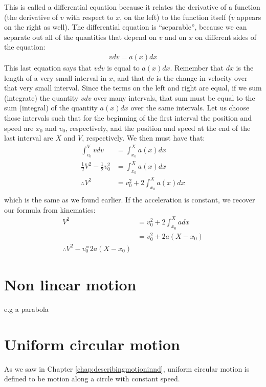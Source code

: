 This is called a differential equation because it relates the derivative of a function (the derivative of $v$ with respect to $x$, on the left) to the function itself ($v$ appears on the right as well). The differential equation is ``separable'', because we can separate out all of the quantities that depend on $v$ and on $x$ on different sides of the equation:
\begin{align*}
vdv = a(x)dx
\end{align*} 
This last equation says that $vdv$ is equal to $a(x)dx$. Remember that $dx$ is the length of a very small interval in $x$, and that $dv$ is the change in velocity over that very small interval. Since the terms on the left and right are equal, if we sum (integrate) the quantity $vdv$ over many intervals, that sum must be equal to the sum (integral) of the quantity $a(x)dx$ over the same intervals. Let us choose those intervals such that for the beginning of the first interval the position and speed are $x_0$ and $v_0$, respectively, and the position and speed at the end of the last interval are $X$ and $V$, respectively. We then must have that:
\begin{align*}
\int_{v_0}^{V}vdv&=\int_{x_0}^{X}a(x)dx\\
 \frac{1}{2}V^2 - \frac{1}{2}v_0^2 &= \int_{x_0}^{X}a(x)dx\\
\therefore V^2 &= v_0^2 + 2\int_{x_0}^{X}a(x)dx\\
\end{align*}
which is the same as we found earlier. If the acceleration is constant, we recover our formula from kinematics:
\begin{align*}
V^2 &= v_0^2+ 2\int_{x_0}^{X}adx\\
&=v_0^2+ 2a(X-x_0)\\
\therefore V^2- v_0^ = 2a(X-x_0)
\end{align*}


\section{Non linear motion}
e.g a parabola 

\section{Uniform circular motion}
As we saw in Chapter \ref{chap:describingmotioninnd}, uniform circular motion is defined to be motion along a circle with constant speed. 

